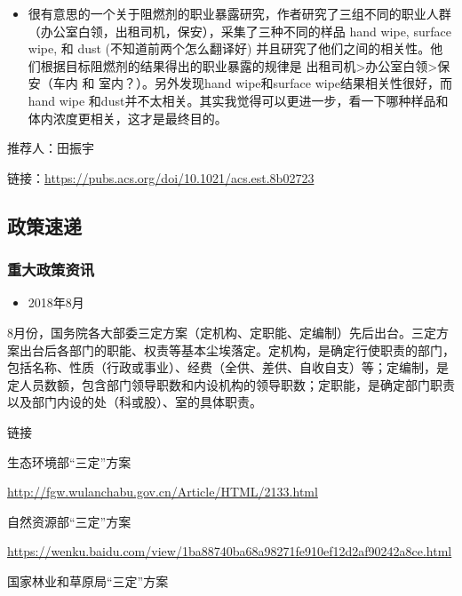 \documentclass[
]{book}
\providecommand{\tightlist}{%
  \setlength{\itemsep}{0pt}\setlength{\parskip}{0pt}}
\begin{document}
\begin{itemize}
\tightlist
\item
  很有意思的一个关于阻燃剂的职业暴露研究，作者研究了三组不同的职业人群（办公室白领，出租司机，保安），采集了三种不同的样品 hand wipe, surface wipe, 和 dust (不知道前两个怎么翻译好) 并且研究了他们之间的相关性。他们根据目标阻燃剂的结果得出的职业暴露的规律是 出租司机\textgreater 办公室白领\textgreater 保安（车内 和 室内？）。另外发现hand wipe和surface wipe结果相关性很好，而hand wipe 和dust并不太相关。其实我觉得可以更进一步，看一下哪种样品和体内浓度更相关，这才是最终目的。
\end{itemize}

推荐人：田振宇

链接：\url{https://pubs.acs.org/doi/10.1021/acs.est.8b02723}

\hypertarget{ux653fux7b56ux901fux9012-4}{%
\subsection*{政策速递}\label{ux653fux7b56ux901fux9012-4}}

\hypertarget{ux91cdux5927ux653fux7b56ux8d44ux8baf-4}{%
\subsubsection*{重大政策资讯}\label{ux91cdux5927ux653fux7b56ux8d44ux8baf-4}}

\begin{itemize}
\tightlist
\item
  2018年8月
\end{itemize}

8月份，国务院各大部委三定方案（定机构、定职能、定编制）先后出台。三定方案出台后各部门的职能、权责等基本尘埃落定。定机构，是确定行使职责的部门，包括名称、性质（行政或事业）、经费（全供、差供、自收自支）等；定编制，是定人员数额，包含部门领导职数和内设机构的领导职数；定职能，是确定部门职责以及部门内设的处（科或股）、室的具体职责。

链接

生态环境部``三定''方案

\url{http://fgw.wulanchabu.gov.cn/Article/HTML/2133.html}

自然资源部``三定''方案

\url{https://wenku.baidu.com/view/1ba88740ba68a98271fe910ef12d2af90242a8ce.html}

国家林业和草原局``三定''方案
\end{document}
